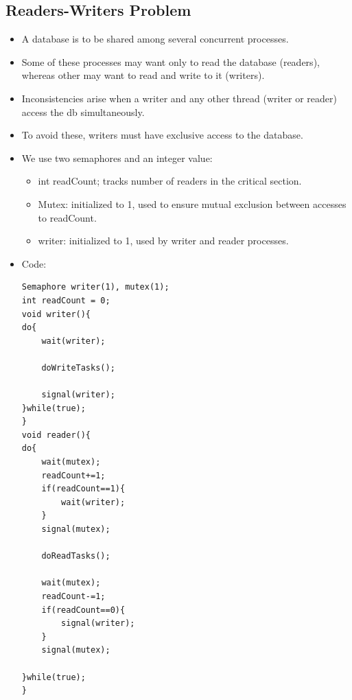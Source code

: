 \documentclass[10pt]{report}
\begin{document}
\subsection{Readers-Writers Problem}
\begin{itemize}
\item A database is to be shared among several concurrent processes.
\item Some of these processes may want only to read the database (readers), whereas other may want to read and write to it (writers).
\item Inconsistencies arise when a writer and any other thread (writer or reader) access the db simultaneously.
\item To avoid these, writers must have exclusive access to the database.
\item We use two semaphores and an integer value:
\begin{itemize}
\item int readCount; tracks number of readers in the critical section.
\item Mutex: initialized to 1, used to ensure mutual exclusion between accesses to readCount.
\item writer: initialized to 1, used by writer and reader processes.
\end{itemize}
\item Code:
\begin{lstlisting}
Semaphore writer(1), mutex(1);
int readCount = 0;
void writer(){
do{
    wait(writer);
    
    doWriteTasks();
    
    signal(writer);
}while(true);
}
void reader(){
do{
    wait(mutex);
    readCount+=1;
    if(readCount==1){
        wait(writer);
    }
    signal(mutex);

    doReadTasks();

    wait(mutex);
    readCount-=1;
    if(readCount==0){
        signal(writer);
    }
    signal(mutex);

}while(true);
}
\end{lstlisting}
\end{itemize}
\end{document}
